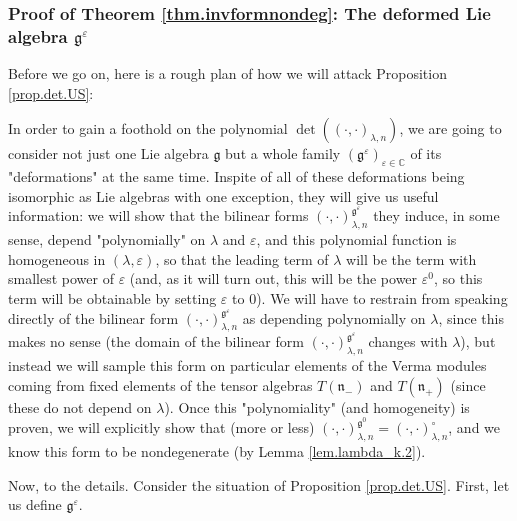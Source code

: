 \documentclass
[numbers=enddot,12pt,final,onecolumn,german,notitlepage]{scrartcl}%
\theoremstyle{definition}
\begin{document}
\subsubsection{Proof of Theorem \ref{thm.invformnondeg}: The deformed Lie
algebra $\mathfrak{g}^{\varepsilon}$}

Before we go on, here is a rough plan of how we will attack Proposition
\ref{prop.det.US}:

In order to gain a foothold on the polynomial $\det\left(  \left(  \cdot
,\cdot\right)  _{\lambda,n}\right)  $, we are going to consider not just one
Lie algebra $\mathfrak{g}$ but a whole family $\left(  \mathfrak{g}%
^{\varepsilon}\right)  _{\varepsilon\in\mathbb{C}}$ of its "deformations" at
the same time. Inspite of all of these deformations being isomorphic as Lie
algebras with one exception, they will give us useful information: we will
show that the bilinear forms $\left(  \cdot,\cdot\right)  _{\lambda
,n}^{\mathfrak{g}^{\varepsilon}}$ they induce, in some sense, depend
"polynomially" on $\lambda$ and $\varepsilon$, and this polynomial function is
homogeneous in $\left(  \lambda,\varepsilon\right)  $, so that the leading
term of $\lambda$ will be the term with smallest power of $\varepsilon$ (and,
as it will turn out, this will be the power $\varepsilon^{0}$, so this term
will be obtainable by setting $\varepsilon$ to $0$). We will have to restrain
from speaking directly of the bilinear form $\left(  \cdot,\cdot\right)
_{\lambda,n}^{\mathfrak{g}^{\varepsilon}}$ as depending polynomially on
$\lambda$, since this makes no sense (the domain of the bilinear form $\left(
\cdot,\cdot\right)  _{\lambda,n}^{\mathfrak{g}^{\varepsilon}}$ changes with
$\lambda$), but instead we will sample this form on particular elements of the
Verma modules coming from fixed elements of the tensor algebras $T\left(
\mathfrak{n}_{-}\right)  $ and $T\left(  \mathfrak{n}_{+}\right)  $ (since
these do not depend on $\lambda$). Once this "polynomiality" (and homogeneity)
is proven, we will explicitly show that (more or less) $\left(  \cdot
,\cdot\right)  _{\lambda,n}^{\mathfrak{g}^{0}}=\left(  \cdot,\cdot\right)
_{\lambda,n}^{\circ}$, and we know this form to be nondegenerate (by Lemma
\ref{lem.lambda_k.2}).

Now, to the details. Consider the situation of Proposition \ref{prop.det.US}.
First, let us define $\mathfrak{g}^{\varepsilon}$.
\end{document}
